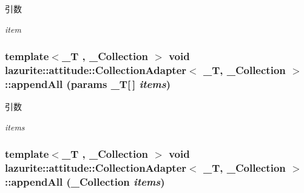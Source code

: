 \begin{DoxyParams}{引数}
\item[{\em item}]\end{DoxyParams}
\hypertarget{classlazurite_1_1attitude_1_1_collection_adapter_3_01___t_00_01___collection_01_4_abc43f199f098dec49c87c2df2c20757a}{
\subsubsection[{appendAll}]{\setlength{\rightskip}{0pt plus 5cm}template$<$\_\-T , \_\-Collection $>$ void lazurite::attitude::CollectionAdapter$<$ \_\-T, \_\-Collection $>$::appendAll (params \_\-T\mbox{[}$\,$\mbox{]} {\em items})}}
\label{classlazurite_1_1attitude_1_1_collection_adapter_3_01___t_00_01___collection_01_4_abc43f199f098dec49c87c2df2c20757a}

\begin{DoxyParams}{引数}
\item[{\em items}]\end{DoxyParams}
\hypertarget{classlazurite_1_1attitude_1_1_collection_adapter_3_01___t_00_01___collection_01_4_ab3ef3ebb80d1bebc281cb18762135ab2}{
\subsubsection[{appendAll}]{\setlength{\rightskip}{0pt plus 5cm}template$<$\_\-T , \_\-Collection $>$ void lazurite::attitude::CollectionAdapter$<$ \_\-T, \_\-Collection $>$::appendAll (\_\-Collection {\em items})}}
\label{classlazurite_1_1attitude_1_1_collection_adapter_3_01___t_00_01___collection_01_4_ab3ef3ebb80d1bebc281cb18762135ab2}

